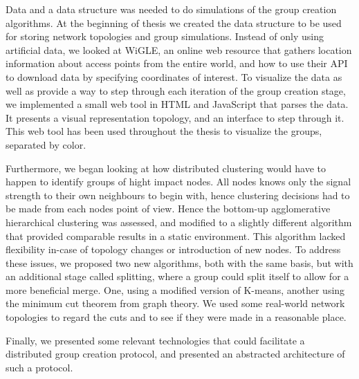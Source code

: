 Data and a data structure was needed to do simulations of the group creation algorithms. At the beginning of thesis we created the data structure
to be used for storing network topologies and group simulations. Instead of only using artificial data, we looked at WiGLE, an online web resource that gathers location information about access points from the entire world, and how to use their API to download data by specifying coordinates of interest.
To visualize the data as well as provide a way to step through each iteration of the group creation stage, we implemented a small web tool in HTML and JavaScript that parses the data.
It presents a visual representation topology, and an interface to step through it. This web tool has been used throughout the thesis to visualize the groups, separated by color. 

Furthermore, we began looking at how distributed clustering would have to happen to identify groups of hight impact nodes.
All nodes knows only the signal strength to their own neighbours to begin with, hence clustering decisions had to be made from each nodes point of view. Hence the bottom-up agglomerative 
hierarchical clustering was assessed, and modified to a slightly different algorithm that provided comparable results in a static environment. This algorithm lacked flexibility in-case of
topology changes or introduction of new nodes. To address these issues, we proposed two new algorithms, both with the same basis, but with an additional stage called splitting, where a group could split itself to allow for a more beneficial merge. One, using a modified version of K-means, another using the minimum cut theorem from graph theory. We used some real-world network topologies
to regard the cuts and to see if they were made in a reasonable place.  

Finally, we presented some relevant technologies that could facilitate a distributed group creation protocol, and presented an abstracted architecture of such a protocol.


